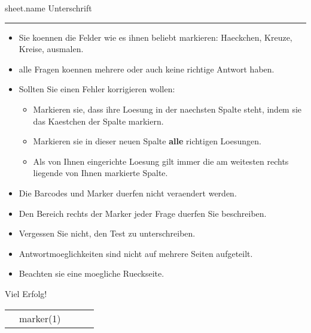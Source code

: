 \documentclass{scrarticle}
\begin{document}
\pagestyle{scrheadings}


{%


\iffalse
{{ sheet.json_readable }}
\fi


\begin{wrapfigure}{r}{ {{common.main_qr_width}} }
    \texttt{[image: \{ '\{']}}{{ sheet.qr }}}
\end{wrapfigure}

\hspace{2em}
{ \Large {{ sheet.name}} } 
    Unterschrift \rule{5cm}{.5pt}

    \begin{itemize}
        \item Sie koennen die Felder wie es ihnen beliebt markieren: Haeckchen, Kreuze, Kreise, ausmalen.
        \item alle Fragen koennen mehrere oder auch keine richtige Antwort haben.
    
        \item Sollten Sie einen Fehler korrigieren wollen:
        \begin{itemize}
            \item Markieren sie, dass ihre Loesung in der naechsten Spalte steht, indem sie das Kaestchen der Spalte markiern.
            \item Markieren sie in dieser neuen Spalte \textbf{alle} richtigen Loesungen.
            \item Als von Ihnen eingerichte Loesung gilt immer die am weitesten rechts liegende von Ihnen markierte Spalte.
        \end{itemize}
    \item Die Barcodes und Marker duerfen nicht veraendert werden.
    \item Den Bereich rechts der Marker jeder Frage duerfen Sie beschreiben.
    \item Vergessen Sie nicht, den Test zu unterschreiben.
    \item Antwortmoeglichkeiten sind nicht auf mehrere Seiten aufgeteilt.
    \item Beachten sie eine moegliche Rueckseite.
\end{itemize}

Viel Erfolg!





\begin{longtable}[l]{r |  c c c | l }

    {%
        & {{ marker(1) }}
    {%
    \endhead
    
}}
\end{longtable}}
\end{document}
